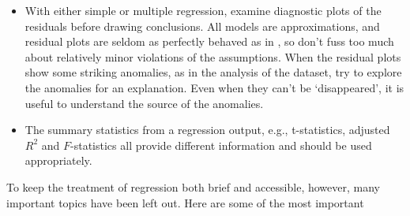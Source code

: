 \begin{itemize}
	\item  With either simple or multiple regression, examine diagnostic plots of the residuals before drawing conclusions.  All models are approximations, and residual plots are seldom as perfectly behaved as in , so don't fuss too much about relatively minor violations of the assumptions.  When the residual plots show some striking anomalies, as in the analysis of the  dataset, try to explore the anomalies for an explanation.  Even when they can't be `disappeared', it is useful to understand the source of the anomalies.
	
	\item  The summary statistics from a regression output, e.g., t-statistics, adjusted $R^2$ and $F$-statistics all provide different information and should be used appropriately.
	
\end{itemize}

To keep the treatment of regression both brief and accessible, however, many important topics have been left out.  Here are some of the most important

